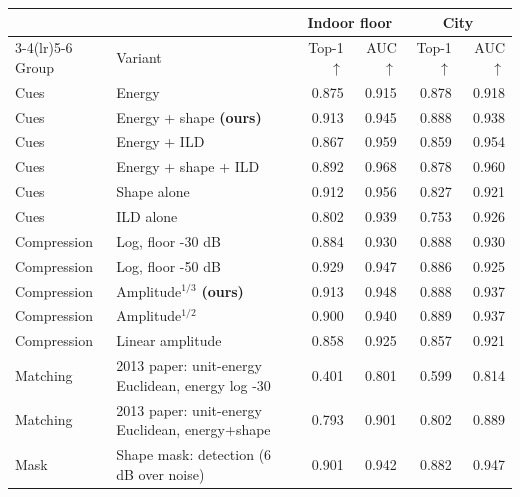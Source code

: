\begin{tabular}{llrrrr}
\toprule
 & & \multicolumn{2}{c}{Indoor floor} & \multicolumn{2}{c}{City} \\
\cmidrule(lr){3-4}\cmidrule(lr){5-6}
Group & Variant & Top-1 $\uparrow$ & AUC $\uparrow$ & Top-1 $\uparrow$ & AUC $\uparrow$ \\
\midrule
Cues & Energy & 0.875 & 0.915 & 0.878 & 0.918 \\
Cues & Energy + shape \textbf{(ours)} & 0.913 & 0.945 & 0.888 & 0.938 \\
Cues & Energy + ILD & 0.867 & 0.959 & 0.859 & 0.954 \\
Cues & Energy + shape + ILD & 0.892 & 0.968 & 0.878 & 0.960 \\
Cues & Shape alone & 0.912 & 0.956 & 0.827 & 0.921 \\
Cues & ILD alone & 0.802 & 0.939 & 0.753 & 0.926 \\
\midrule
Compression & Log, floor -30 dB & 0.884 & 0.930 & 0.888 & 0.930 \\
Compression & Log, floor -50 dB & 0.929 & 0.947 & 0.886 & 0.925 \\
Compression & Amplitude$^{1/3}$ \textbf{(ours)} & 0.913 & 0.948 & 0.888 & 0.937 \\
Compression & Amplitude$^{1/2}$ & 0.900 & 0.940 & 0.889 & 0.937 \\
Compression & Linear amplitude & 0.858 & 0.925 & 0.857 & 0.921 \\
\midrule
Matching & 2013 paper: unit-energy Euclidean, energy log -30 & 0.401 & 0.801 & 0.599 & 0.814 \\
Matching & 2013 paper: unit-energy Euclidean, energy+shape & 0.793 & 0.901 & 0.802 & 0.889 \\
\midrule
Mask & Shape mask: detection (6 dB over noise) & 0.901 & 0.942 & 0.882 & 0.947 \\
\bottomrule
\end{tabular}
